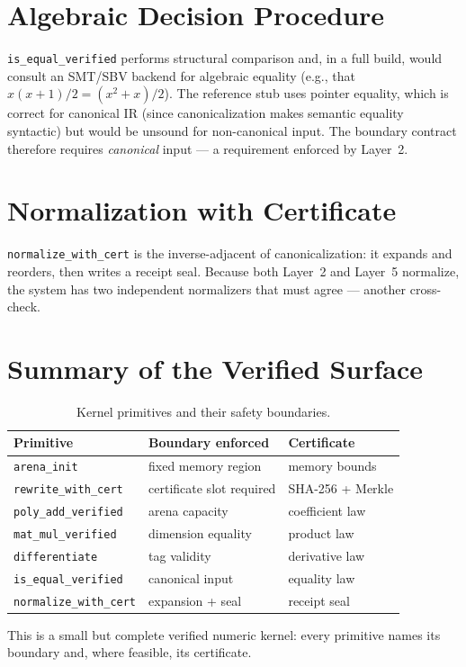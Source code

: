 \section{Algebraic Decision Procedure}
\label{sec:kern-dec}

\texttt{is\_equal\_verified} performs structural comparison and, in a full
build, would consult an SMT/SBV backend for algebraic equality (e.g., that
$x(x+1)/2 = (x^2+x)/2$). The reference stub uses pointer equality, which is
correct for canonical IR (since canonicalization makes semantic equality
syntactic) but would be unsound for non-canonical input. The boundary contract
therefore requires \emph{canonical} input --- a requirement enforced by
Layer~2.

\section{Normalization with Certificate}
\label{sec:kern-norm}

\texttt{normalize\_with\_cert} is the inverse-adjacent of canonicalization:
it expands and reorders, then writes a receipt seal. Because both Layer~2 and
Layer~5 normalize, the system has two independent normalizers that must agree
--- another cross-check.

\section{Summary of the Verified Surface}
\label{sec:kern-summary}

\begin{table}[H]
\centering
\caption{Kernel primitives and their safety boundaries.}
\label{tab:kern}
\begin{tabularx}{\textwidth}{lXl}
\toprule
\textbf{Primitive} & \textbf{Boundary enforced} & \textbf{Certificate} \\
\midrule
\texttt{arena\_init}      & fixed memory region          & memory bounds \\
\texttt{rewrite\_with\_cert} & certificate slot required & SHA-256 + Merkle \\
\texttt{poly\_add\_verified} & arena capacity           & coefficient law \\
\texttt{mat\_mul\_verified}  & dimension equality       & product law \\
\texttt{differentiate}       & tag validity             & derivative law \\
\texttt{is\_equal\_verified} & canonical input          & equality law \\
\texttt{normalize\_with\_cert} & expansion + seal       & receipt seal \\
\bottomrule
\end{tabularx}
\end{table}
This is a small but complete verified numeric kernel: every primitive names
its boundary and, where feasible, its certificate.

